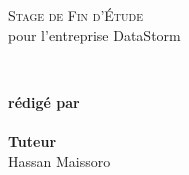 \begin{titlepage}

	\begin{center}

		

		\textsc{\LARGE Stage de Fin d'Étude }\\[0.5cm]
		{\Large pour l'entreprise DataStorm}\\ [1cm]

		\HRule%
		\vspace{0.4cm}

		{\huge \bfseries \articletitle}\\[0.4cm]
		
		\HRule%
		\vspace{1.5cm}

	\vfill
	\end{center}
	
	
	
	\begin{flushright} \Large
		\textbf{rédigé par}%
		\\
		\auteur%
		\\
		\textbf{Tuteur}%
		\\
		Hassan Maissoro
	\end{flushright}



	\begin{center}
		{\large{\customdate}}
	\end{center}
\end{titlepage}
